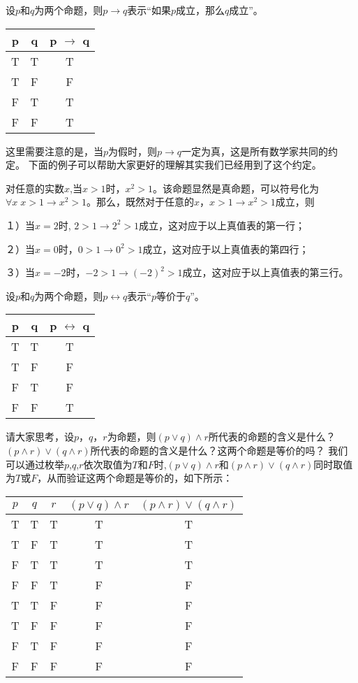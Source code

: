 \documentclass{article}
\begin{document}
\begin{CJK}{UTF8}{gbsn}
设$p$和$q$为两个命题，则$p\to q$表示“如果$p$成立，那么$q$成立”。  

    \begin{tabular}{cc|c}
    p& q& p $\to$ q\\
    \hline
    T&T&T\\
    T&F&F\\
    F&T&T\\
    F&F&T\\
    \end{tabular}\hspace{0.87cm}

    这里需要注意的是，当$p$为假时，则$p\to q$一定为真，这是所有数学家共同的约定。
    下面的例子可以帮助大家更好的理解其实我们已经用到了这个约定。

    对任意的实数$x$,当$x>1$时，$x^2 > 1$。该命题显然是真命题，可以符号化为$\forall x \; x > 1 \to x^2 > 1$。那么，既然对于任意的$x$，$x>1 \to x^2>1$成立，则

    １）当$x=2$时, $2 > 1 \to 2^2 >1$成立，这对应于以上真值表的第一行；

    ２）当$x=0$时，$0 > 1 \to 0^2 > 1$成立，这对应于以上真值表的第四行；

    ３）当$x=-2$时，$-2>1 \to (-2)^2 > 1$成立，这对应于以上真值表的第三行。
    
设$p$和$q$为两个命题，则$p\leftrightarrow q$表示“$p$等价于$q$”。  

  \begin{tabular}{cc|c}
    p& q& p $\leftrightarrow$ q\\
    \hline
    T&T&T\\
    T&F&F\\
    F&T&F\\
    F&F&T\\
  \end{tabular}

  请大家思考，设$p$，$q$，$r$为命题，则$(p\lor q)\land r$所代表的命题的含义是什么？$(p\land r)\lor (q \land r)$所代表的命题的含义是什么？这两个命题是等价的吗？
  我们可以通过枚举$p$,$q$,$r$依次取值为$T$和$F$时,$(p\lor q)\land r$和$(p\land r)\lor (q \land r)$同时取值为$T$或$F$，从而验证这两个命题是等价的，如下所示：

    \begin{tabular}{ccc|cc}
    $p$& $q$& $r$& $(p\lor q)\land r$&$(p\land r)\lor (q \land r)$\\
    \hline
    T&T&T&T&T\\
    T&F&T&T&T\\
    F&T&T&T&T\\
      F&F&T&F&F\\
    T&T&F&F&F\\
    T&F&F&F&F\\
    F&T&F&F&F\\
      F&F&F&F&F\\      
  \end{tabular}


\end{CJK}
\end{document}
